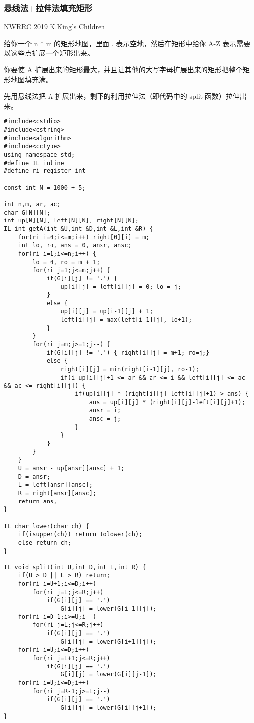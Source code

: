 \documentclass[UTF8]{ctexart}
\begin{document}
\subsubsection{悬线法+拉伸法填充矩形}

NWRRC 2019 K.King's Children

给你一个 n * m 的矩形地图，里面 . 表示空地，然后在矩形中给你 A-Z 表示需要以这些点扩展一个矩形出来。

你要使 A 扩展出来的矩形最大，并且让其他的大写字母扩展出来的矩形把整个矩形地图填充满。

先用悬线法把 A 扩展出来，剩下的利用拉伸法（即代码中的 split 函数）拉伸出来。

\begin{framed}
\begin{lstlisting}
#include<cstdio>
#include<cstring>
#include<algorithm>
#include<cctype>
using namespace std;
#define IL inline
#define ri register int 

const int N = 1000 + 5;

int n,m, ar, ac;
char G[N][N];
int up[N][N], left[N][N], right[N][N];
IL int getA(int &U,int &D,int &L,int &R) {
    for(ri i=0;i<=m;i++) right[0][i] = m;
    int lo, ro, ans = 0, ansr, ansc;
    for(ri i=1;i<=n;i++) {
        lo = 0, ro = m + 1;
        for(ri j=1;j<=m;j++) {
            if(G[i][j] != '.') {
                up[i][j] = left[i][j] = 0; lo = j;
            }
            else {
                up[i][j] = up[i-1][j] + 1;
                left[i][j] = max(left[i-1][j], lo+1);
            }
        }
        for(ri j=m;j>=1;j--) {
            if(G[i][j] != '.') { right[i][j] = m+1; ro=j;}
            else {
                right[i][j] = min(right[i-1][j], ro-1);
                if(i-up[i][j]+1 <= ar && ar <= i && left[i][j] <= ac && ac <= right[i][j]) {
                    if(up[i][j] * (right[i][j]-left[i][j]+1) > ans) {
                        ans = up[i][j] * (right[i][j]-left[i][j]+1);
                        ansr = i;
                        ansc = j;
                    }
                }
            }
        }
    }
    U = ansr - up[ansr][ansc] + 1;
    D = ansr;
    L = left[ansr][ansc];
    R = right[ansr][ansc];
    return ans; 
}

IL char lower(char ch) {
    if(isupper(ch)) return tolower(ch);
    else return ch;
}

IL void split(int U,int D,int L,int R) {
    if(U > D || L > R) return;
    for(ri i=U+1;i<=D;i++) 
        for(ri j=L;j<=R;j++) 
            if(G[i][j] == '.') 
                G[i][j] = lower(G[i-1][j]);
    for(ri i=D-1;i>=U;i--) 
        for(ri j=L;j<=R;j++) 
            if(G[i][j] == '.') 
                G[i][j] = lower(G[i+1][j]);
    for(ri i=U;i<=D;i++) 
        for(ri j=L+1;j<=R;j++) 
            if(G[i][j] == '.') 
                G[i][j] = lower(G[i][j-1]);
    for(ri i=U;i<=D;i++) 
        for(ri j=R-1;j>=L;j--) 
            if(G[i][j] == '.') 
                G[i][j] = lower(G[i][j+1]);
}


\end{lstlisting}
\end{framed}
\end{document}
